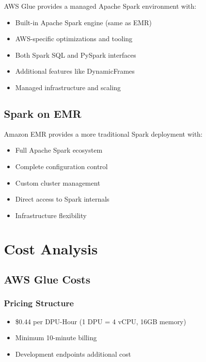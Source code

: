 \documentclass[
  letterpaper,
  DIV=11,
  numbers=noendperiod]{scrartcl}
\providecommand{\tightlist}{%
  \setlength{\itemsep}{0pt}\setlength{\parskip}{0pt}}\usepackage{longtable,booktabs,array}
\begin{document}
AWS Glue provides a managed Apache Spark environment with:

\begin{itemize}
\tightlist
\item
  Built-in Apache Spark engine (same as EMR)
\item
  AWS-specific optimizations and tooling
\item
  Both Spark SQL and PySpark interfaces
\item
  Additional features like DynamicFrames
\item
  Managed infrastructure and scaling
\end{itemize}

\subsection*{Spark on EMR}\label{spark-on-emr}

Amazon EMR provides a more traditional Spark deployment with:

\begin{itemize}
\tightlist
\item
  Full Apache Spark ecosystem
\item
  Complete configuration control
\item
  Custom cluster management
\item
  Direct access to Spark internals
\item
  Infrastructure flexibility
\end{itemize}

\section{Cost Analysis}\label{cost-analysis}

\subsection{AWS Glue Costs}\label{aws-glue-costs}

\subsubsection{Pricing Structure}

\begin{itemize}
\tightlist
\item
  \$0.44 per DPU-Hour (1 DPU = 4 vCPU, 16GB memory)
\item
  Minimum 10-minute billing
\item
  Development endpoints additional cost
\end{itemize}
\end{document}
